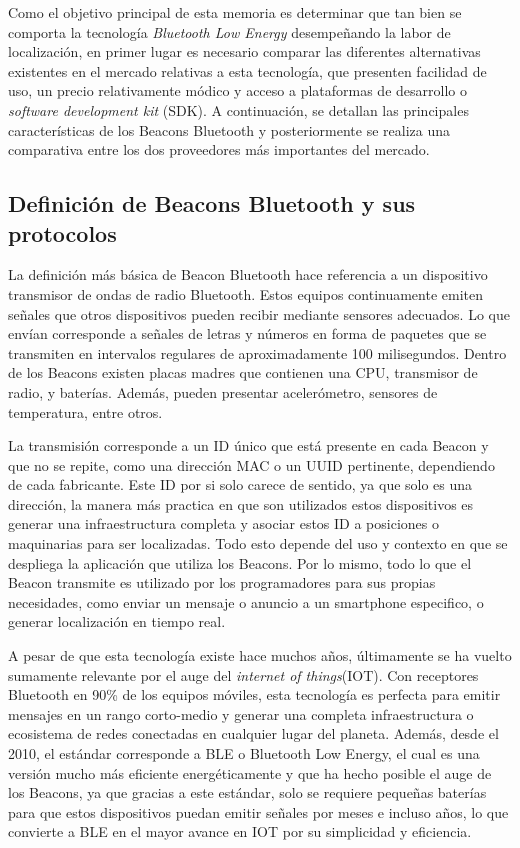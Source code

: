 Como el objetivo principal de esta memoria es determinar que tan bien se comporta la tecnología \textit{Bluetooth Low Energy} desempeñando la labor de localización, en primer lugar es necesario comparar las diferentes alternativas existentes en el mercado relativas a esta tecnología, que presenten facilidad de uso, un precio relativamente módico y acceso a plataformas de desarrollo o \textit{software development kit} (SDK). A continuación, se detallan las principales características de los Beacons Bluetooth y posteriormente se realiza una comparativa entre los dos proveedores más importantes del mercado.

\subsection{Definición de Beacons Bluetooth y sus protocolos}

La definición más básica de Beacon Bluetooth hace referencia a un dispositivo transmisor de ondas de radio Bluetooth. Estos equipos continuamente emiten señales que otros dispositivos pueden recibir mediante sensores adecuados. Lo que envían corresponde a señales de letras y números en forma de paquetes que se transmiten en intervalos regulares de aproximadamente 100 milisegundos. Dentro de los Beacons existen placas madres que contienen una CPU, transmisor de radio, y baterías. Además, pueden presentar acelerómetro, sensores de temperatura, entre otros.

La transmisión corresponde a un ID único que está presente en cada Beacon y que no se repite, como una dirección MAC o un UUID pertinente, dependiendo de cada fabricante. Este ID por si solo carece de sentido, ya que solo es una dirección, la manera más practica en que son utilizados estos dispositivos es generar una infraestructura completa y asociar estos ID a posiciones o maquinarias para ser localizadas. Todo esto depende del uso y contexto en que se despliega la aplicación que utiliza los Beacons. Por lo mismo, todo lo que el Beacon transmite es utilizado por los programadores para sus propias necesidades, como enviar un mensaje o anuncio a un smartphone especifico, o generar localización en tiempo real.

A pesar de que esta tecnología existe hace muchos años, últimamente se ha vuelto sumamente relevante por el auge del \textit{internet of things}(IOT). Con receptores Bluetooth en 90\% de los equipos móviles, esta tecnología es perfecta para emitir mensajes en un rango corto-medio y generar una completa infraestructura o ecosistema de redes conectadas en cualquier lugar del planeta. Además, desde el 2010, el estándar corresponde a BLE o Bluetooth Low Energy, el cual es una versión mucho más eficiente energéticamente y que ha hecho posible el auge de los Beacons, ya que gracias a este estándar, solo se requiere pequeñas baterías para que estos dispositivos puedan emitir señales por meses e incluso años, lo que convierte a BLE en el mayor avance en IOT por su simplicidad y eficiencia.

